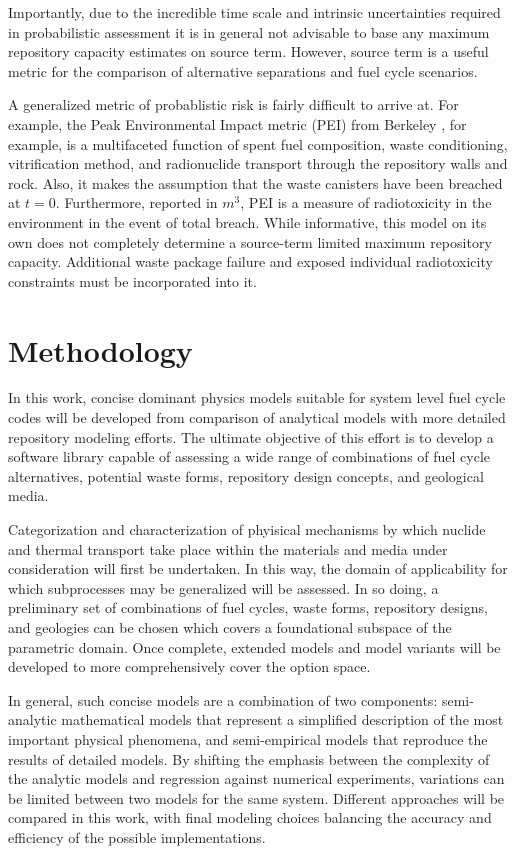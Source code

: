 Importantly, due to the incredible time scale and intrinsic 
uncertainties required in probabilistic assessment it is in general 
not advisable to base any maximum repository capacity estimates on 
source term. However, source term is a useful metric for the 
comparison of alternative separations and fuel cycle scenarios.

A generalized metric of probablistic risk is fairly difficult to 
arrive at. For example, the Peak Environmental Impact metric (PEI) 
from Berkeley \cite{bouvier_comparison_2007}, for example, is a 
multifaceted function of spent fuel composition, waste conditioning, 
vitrification method, and radionuclide transport through the 
repository walls and rock.  Also, it makes the assumption that the 
waste canisters have been breached at $t=0$. Furthermore, reported in 
$m^3$, PEI is a measure of radiotoxicity in the environment in the 
event of total breach. While informative, this model on its own does 
not completely determine a source-term limited maximum repository 
capacity. Additional waste package failure and exposed individual 
radiotoxicity constraints must be incorporated into it.

\section{Methodology} 

In this work, concise dominant physics models suitable for system 
level fuel cycle codes will be developed from comparison of analytical 
models with more detailed repository modeling efforts. The ultimate 
objective of this effort is to develop a software library capable of 
assessing a wide range of combinations of fuel cycle alternatives, 
potential waste forms, repository design concepts, and geological 
media.  

Categorization and characterization of phyisical mechanisms by which 
nuclide and thermal transport take place within the materials and 
media under consideration will first be undertaken. In this way, the 
domain of applicability for which subprocesses may be generalized will 
be assessed. In so doing, a preliminary set of combinations of fuel 
cycles, waste forms, repository designs, and geologies can be chosen 
which covers a foundational subspace of the parametric domain. Once 
complete, extended models and model variants will be developed to more 
comprehensively cover the option space.  

In general, such concise models are a combination of two components: 
semi-analytic mathematical models that represent a simplified 
description of the most important physical phenomena, and 
semi-empirical models that reproduce the results of detailed models.  
By shifting the emphasis between the complexity of the analytic models 
and regression against numerical experiments, variations can be 
limited between two models for the same system.  Different approaches 
will be compared in this work, with final modeling choices balancing 
the accuracy and efficiency of the possible implementations.  


